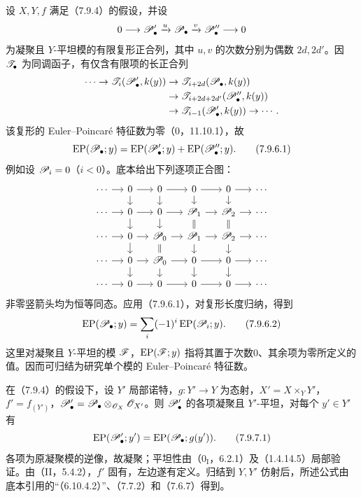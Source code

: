 设 $X,Y,f$ 满足（7.9.4）的假设，并设
\[
 0\longrightarrow\mathscr P'_\bullet\xrightarrow{u}\mathscr P_\bullet
 \xrightarrow{v}\mathscr P''_\bullet\longrightarrow0
\]
为凝聚且 $Y$-平坦模的有限复形正合列，其中 $u,v$ 的次数分别为偶数 $2d,2d'$。因 $\mathscr T_\bullet$ 为同调函子，有仅含有限项的长正合列
\[
\begin{aligned}
 \cdots\to\mathscr T_i(\mathscr P'_\bullet,k(y))
 &\to\mathscr T_{i+2d}(\mathscr P_\bullet,k(y))\\
 &\to\mathscr T_{i+2d+2d'}(\mathscr P''_\bullet,k(y))\\
 &\to\mathscr T_{i-1}(\mathscr P'_\bullet,k(y))\to\cdots.
\end{aligned}
\]
该复形的 Euler--Poincaré 特征数为零（0，11.10.1），故
\begin{equation}
 \operatorname{EP}(\mathscr P_\bullet;y)
 =\operatorname{EP}(\mathscr P'_\bullet;y)+\operatorname{EP}(\mathscr P''_\bullet;y).
 \tag{7.9.6.1}
\end{equation}
例如设 $\mathscr P_i=0$（$i<0$）。底本给出下列逐项正合图：
\[
 \begin{tikzcd}[column sep=small,row sep=small]
 \cdots\arrow[r]&0\arrow[r]\arrow[d]&0\arrow[r]\arrow[d]&0\arrow[r]\arrow[d]&0\arrow[r]\arrow[d]&\cdots\\
 \cdots\arrow[r]&0\arrow[r]\arrow[d]&0\arrow[r]\arrow[d]&\PP_1\arrow[r]\arrow[d,equal]&\PP_2\arrow[r]\arrow[d,equal]&\cdots\\
 \cdots\arrow[r]&0\arrow[r]\arrow[d]&\PP_0\arrow[r]\arrow[d,equal]&\PP_1\arrow[r]\arrow[d]&\PP_2\arrow[r]\arrow[d]&\cdots\\
 \cdots\arrow[r]&0\arrow[r]\arrow[d]&\PP_0\arrow[r]\arrow[d]&0\arrow[r]\arrow[d]&0\arrow[r]\arrow[d]&\cdots\\
 \cdots\arrow[r]&0\arrow[r]&0\arrow[r]&0\arrow[r]&0\arrow[r]&\cdots
 \end{tikzcd}
\]
非零竖箭头均为恒等同态。应用（7.9.6.1），对复形长度归纳，得到
\begin{equation}
 \operatorname{EP}(\mathscr P_\bullet;y)
 =\sum_i(-1)^i\operatorname{EP}(\mathscr P_i;y).\tag{7.9.6.2}
\end{equation}
这里对凝聚且 $Y$-平坦的模 $\mathscr F$，$\operatorname{EP}(\mathscr F;y)$ 指将其置于次数0、其余项为零所定义的值。因而可归结为研究单个模的 Euler--Poincaré 特征数。

在（7.9.4）的假设下，设 $Y'$ 局部诺特，$g:Y'\to Y$ 为态射，$X'=X\times_Y Y'$，$f'=f_{(Y')}$，$\mathscr P'_\bullet=\mathscr P_\bullet\otimes_{\mathscr O_X}\mathscr O_{X'}$。则 $\mathscr P'_\bullet$ 的各项凝聚且 $Y'$-平坦，对每个 $y'\in Y'$ 有
\begin{equation}
 \operatorname{EP}(\mathscr P'_\bullet;y')
 =\operatorname{EP}(\mathscr P_\bullet;g(y')).\tag{7.9.7.1}
\end{equation}
各项为原凝聚模的逆像，故凝聚；平坦性由（$0_{\mathrm I}$，6.2.1）及（1.4.14.5）局部验证。由（II，5.4.2），$f'$ 固有，左边遂有定义。归结到 $Y,Y'$ 仿射后，所述公式由底本引用的“（6.10.4.2）”、（7.7.2）和（7.6.7）得到。


